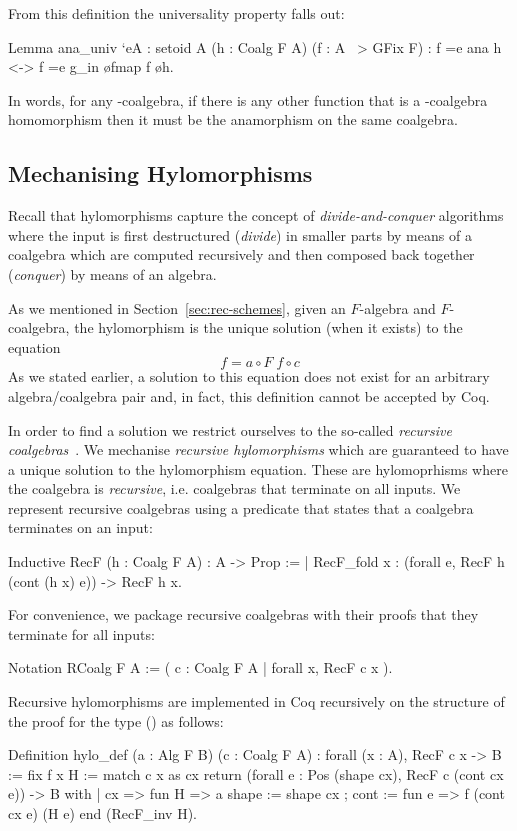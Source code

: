 \documentclass{llncs}
\begin{document}
\noindent
From this definition the universality property falls out:
\begin{coqcode}
Lemma ana_univ `{eA : setoid A} (h : Coalg F A) (f : A ~> GFix F)
: f =e ana h <-> f =e g_in \o fmap f \o h.
\end{coqcode}
In words, for any -coalgebra, if there is any other function 
that is a -coalgebra homomorphism then it must be the anamorphism on the
same coalgebra.

\subsection{Mechanising Hylomorphisms}
\label{sec:rec-coalgebras}
Recall that hylomorphisms capture the concept of \emph{divide-and-conquer}
algorithms where the input is first destructured (\emph{divide}) in smaller
parts by means of a coalgebra which are computed recursively and then composed
back together (\emph{conquer}) by means of an algebra.

As we mentioned in Section~\ref{sec:rec-schemes}, given an $F$-algebra and
$F$-coalgebra, the hylomorphism is the unique solution (when it exists) to the
equation
\[
  f = a \circ F\; f \circ c
\]
As we stated earlier, a solution to this equation does not exist for an
arbitrary  algebra/coalgebra pair and, in fact, this definition cannot be
accepted by Coq.

In order to find a solution we restrict ourselves to the so-called
\emph{recursive coalgebras}~\cite{AdamekMM19,CaprettaUV04}.  We mechanise
\emph{recursive hylomorphisms} which are guaranteed to have a unique solution to
the hylomorphism equation. These are hylomoprhisms where the coalgebra is
\emph{recursive}, i.e. coalgebras that terminate on all inputs. We represent
recursive coalgebras using a predicate that states that a coalgebra terminates
on an input:
\begin{coqcode}
Inductive RecF (h : Coalg F A) : A -> Prop :=
| RecF_fold x : (forall e, RecF h (cont (h x) e)) -> RecF h x.
\end{coqcode}

\noindent
For convenience, we package recursive coalgebras with their proofs that they
terminate for all inputs:
\begin{coqcode}
Notation RCoalg F A := ({ c : Coalg F A | forall x, RecF c x }).
\end{coqcode}
Recursive hylomorphisms are implemented in Coq recursively on the structure of
the proof for the type () as follows:
\begin{coqcode}
Definition hylo_def (a : Alg F B) (c : Coalg F A)
  : forall (x : A), RecF c x -> B
  := fix f x H
     := match c x as cx
          return (forall e : Pos (shape cx), RecF c (cont cx e)) -> B
        with
        | cx => fun H =>
            a { shape := shape cx ; cont := fun e => f (cont cx e) (H e) }
        end (RecF_inv H).
\end{coqcode}
\end{document}
